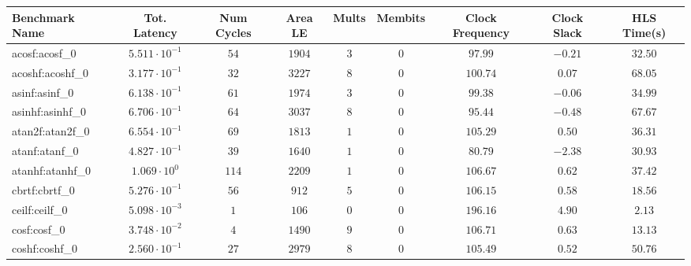 \begin{tabular}{|l|c|c|c|c|c|c|c|c|}
\hline
Benchmark Name               & Tot. Latency            & Num Cycles & Area LE   & Mults   & Membits    & Clock Frequency & Clock Slack & HLS Time(s) \\
\hline
acosf:acosf\_0               & $ 5.511 \cdot 10^{-1} $ & $ 54     $ & $ 1904  $ & $ 3   $ & $ 0      $ & $ 97.99       $ & $ -0.21   $ & $ 32.50   $ \\
acoshf:acoshf\_0             & $ 3.177 \cdot 10^{-1} $ & $ 32     $ & $ 3227  $ & $ 8   $ & $ 0      $ & $ 100.74      $ & $ 0.07    $ & $ 68.05   $ \\
asinf:asinf\_0               & $ 6.138 \cdot 10^{-1} $ & $ 61     $ & $ 1974  $ & $ 3   $ & $ 0      $ & $ 99.38       $ & $ -0.06   $ & $ 34.99   $ \\
asinhf:asinhf\_0             & $ 6.706 \cdot 10^{-1} $ & $ 64     $ & $ 3037  $ & $ 8   $ & $ 0      $ & $ 95.44       $ & $ -0.48   $ & $ 67.67   $ \\
atan2f:atan2f\_0             & $ 6.554 \cdot 10^{-1} $ & $ 69     $ & $ 1813  $ & $ 1   $ & $ 0      $ & $ 105.29      $ & $ 0.50    $ & $ 36.31   $ \\
atanf:atanf\_0               & $ 4.827 \cdot 10^{-1} $ & $ 39     $ & $ 1640  $ & $ 1   $ & $ 0      $ & $ 80.79       $ & $ -2.38   $ & $ 30.93   $ \\
atanhf:atanhf\_0             & $ 1.069 \cdot 10^{0}  $ & $ 114    $ & $ 2209  $ & $ 1   $ & $ 0      $ & $ 106.67      $ & $ 0.62    $ & $ 37.42   $ \\
cbrtf:cbrtf\_0               & $ 5.276 \cdot 10^{-1} $ & $ 56     $ & $ 912   $ & $ 5   $ & $ 0      $ & $ 106.15      $ & $ 0.58    $ & $ 18.56   $ \\
ceilf:ceilf\_0               & $ 5.098 \cdot 10^{-3} $ & $ 1      $ & $ 106   $ & $ 0   $ & $ 0      $ & $ 196.16      $ & $ 4.90    $ & $ 2.13    $ \\
cosf:cosf\_0                 & $ 3.748 \cdot 10^{-2} $ & $ 4      $ & $ 1490  $ & $ 9   $ & $ 0      $ & $ 106.71      $ & $ 0.63    $ & $ 13.13   $ \\
coshf:coshf\_0               & $ 2.560 \cdot 10^{-1} $ & $ 27     $ & $ 2979  $ & $ 8   $ & $ 0      $ & $ 105.49      $ & $ 0.52    $ & $ 50.76   $ \\

\end{tabular}
